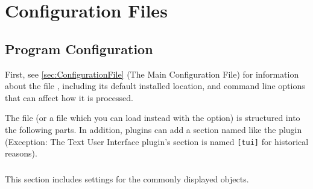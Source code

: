 

\chapter{Configuration Files}
\label{app:ConfigFiles}

\section{Program Configuration}
\label{sec:config.ini}
First, see \ref{sec:ConfigurationFile} (The
Main Configuration File) for information about the file , including its
default installed location, and command line options that can
affect how it is processed.


The file  (or a file which you can load instead with
the  option) is structured into the following
parts. In addition, plugins can add a section named like the plugin
(Exception: The Text User Interface plugin's section is named \texttt{[tui]}
for historical reasons).

\subsection{}
\label{sec:config.ini:astro}

This section includes settings for the commonly displayed objects.

